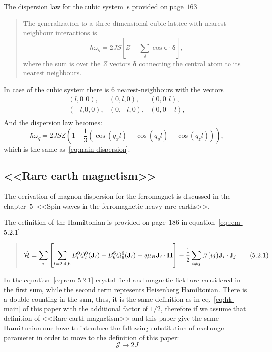     The dispersion law for the cubic system is provided  on page~$163$
    \begin{quote}
        The generalization to a three-dimensional cubic lattice with nearest-neighbour interactions is
        \begin{equation}
            \hbar \omega_q = 2JS\left[Z - \sum_{\delta}\cos\mathbf{q\cdot\delta}\right],
        \end{equation}
        where the sum is over the $Z$ vectors $\mathbf{\delta}$ connecting the central atom to its nearest neighbours.
    \end{quote}
    In case of the cubic system there is $6$ nearest-neighbours with the vectors 
    \begin{equation}
        \begin{matrix}
            (l, 0, 0),& (0, l, 0),& (0, 0, l),\\
            (-l, 0, 0),& (0, -l, 0),& (0, 0, -l),\\
        \end{matrix}
    \end{equation}
    And the dispersion law becomes:
    \begin{equation}
        \hbar \omega_q = 2JSZ\left(1 - \dfrac{1}{3}\left(\cos(q_xl) + \cos(q_yl) + \cos(q_zl)\right)\right),
    \end{equation}
    which is the same as~\eqref{eq:main-dispersion}.

\subsection{<<Rare earth magnetism>>\cite{jensen1991rare}}
    The derivation of magnon dispersion for the ferromagnet is discussed in the chapter~$5$~<<Spin waves in the ferromagnetic heavy rare earths>>.

    The definition of the Hamiltonian is provided on page~$186$ in equation~\eqref{eq:rem-5.2.1}

    \begin{quote}
        \begin{equation}
            \hat{\mathcal{H}} = \sum_i\left[\sum_{l = 2,4,6}B^0_lQ_l^0(\mathbf{J}_i) + B^6_6Q_6^6(\mathbf{J}_i) - g\mu_B \mathbf{J}_i\cdot\mathbf{H}\right]
            - \dfrac{1}{2} \sum_{i\ne j} \mathcal{J}(ij)\mathbf{J} _i\cdot\mathbf{J}_j\label{eq:rem-5.2.1} \tag{5.2.1}
        \end{equation}
    \end{quote}
    
    In the equation~\eqref{eq:rem-5.2.1} crystal field and magnetic field are considered in the first sum, while the second term represents Heisenberg Hamiltonian.
    There is a double counting in the sum, thus, it is the same definition as in eq.~\eqref{eq:hh-main} of this paper 
    with the additional factor of $1/2$, therefore if we assume that definition of <<Rare earth magnetism>> and this paper give the same Hamiltonian one have to 
    introduce the following substitution of exchange parameter in order to move to the definition of this paper:
    \begin{equation}
        \mathcal{J} \rightarrow 2J \label{eq:rem-sub}
    \end{equation}

